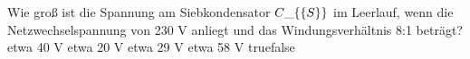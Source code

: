     {Wie groß ist die Spannung am Siebkondensator $C\_\{\textrm\{S\}\}$ im Leerlauf, wenn die Netzwechselspannung von 230 V anliegt und das Windungsverhältnis 8:1 beträgt?}
    {etwa 40 V}
    {etwa 20 V}
    {etwa 29 V}
    {etwa 58 V}
    {true}{false}